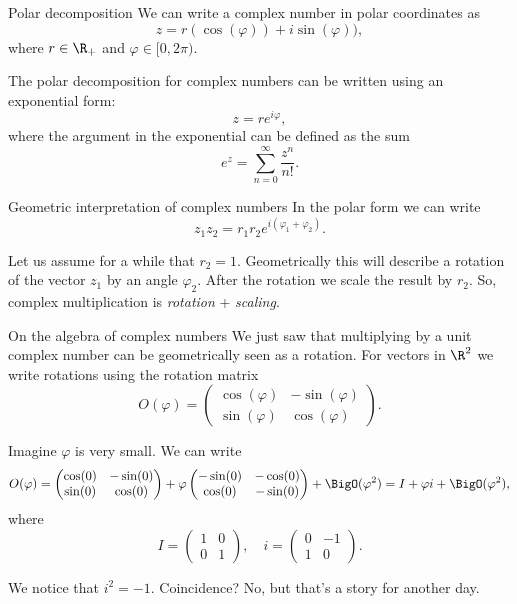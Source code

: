 \begin{frame}{Polar decomposition}
	We can write a complex number in polar coordinates as
	\[ z =  r(\cos(\varphi)) + i\sin(\varphi)), \]
	where $ r \in \R_+ $ and $ \varphi \in [0,2\pi) $.
	
	\pause
	The polar decomposition for complex numbers can be written using an exponential form:
	\[ z = r e^{i \varphi}, \]
	where the argument in the exponential can be defined as the sum 
	\[ e^{z} = \sum_{n=0}^{\infty} \frac{z^n}{n!}. \]
\end{frame}

\begin{frame}{Geometric interpretation of complex numbers}
	In the polar form we can write
	\[ z_1 z_2 = r_1 r_2 e^{i(\varphi_1+\varphi_2)}. \]
	
	\pause
	Let us assume for a while that $ r_2 = 1 $. Geometrically this will describe a rotation of the vector $ z_1 $ by an angle $ \varphi_2 $. After the rotation we scale the result by $ r_2 $. So, complex multiplication is \emph{rotation} + \emph{scaling}. 
\end{frame}

\begin{frame}{On the algebra of complex numbers}
	We just saw that multiplying by a unit complex number can be geometrically seen as a rotation. For vectors in $ \R^2 $ we write rotations using the rotation matrix
	\[ O(\varphi) = \begin{pmatrix}
		\cos(\varphi) & -\sin(\varphi) \\
		\sin(\varphi) & \cos(\varphi)
	\end{pmatrix}. \]

	\pause
	Imagine $ \varphi $ is very small. We can write
	\[ O(\varphi) = \begin{pmatrix}
		\cos(0) & -\sin(0) \\
		\sin(0) & \cos(0)
		\end{pmatrix} 
	+ \varphi \begin{pmatrix}
		-\sin(0) & -\cos(0) \\
		\cos(0) & -\sin(0)
	\end{pmatrix} + \BigO(\varphi^2) 
	= I + \varphi i +  \BigO(\varphi^2),
	\]
	where 
	\[ I = \begin{pmatrix}
		1 & 0 \\
		0 & 1
	\end{pmatrix}, \quad
	i = \begin{pmatrix}
		0 & -1 \\
		1 & 0
	\end{pmatrix}.  \]
	
	\pause
	We notice that $ i^2 = -1 $. Coincidence? \pause No, but that's a story for another day.
\end{frame}

